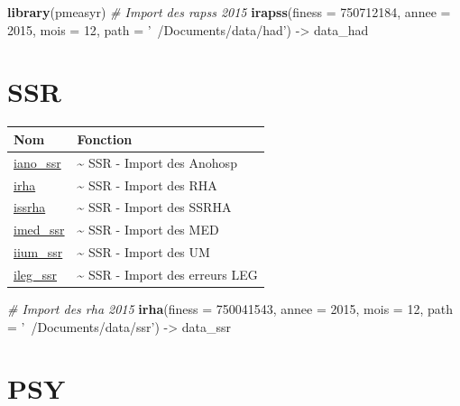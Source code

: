 \documentclass[]{book}
\newenvironment{Shaded}{\begin{snugshade}}{\end{snugshade}}
\newcommand{\KeywordTok}[1]{\textcolor[rgb]{0.13,0.29,0.53}{\textbf{{#1}}}}
\newcommand{\DataTypeTok}[1]{\textcolor[rgb]{0.13,0.29,0.53}{{#1}}}
\newcommand{\DecValTok}[1]{\textcolor[rgb]{0.00,0.00,0.81}{{#1}}}
\newcommand{\StringTok}[1]{\textcolor[rgb]{0.31,0.60,0.02}{{#1}}}
\newcommand{\CommentTok}[1]{\textcolor[rgb]{0.56,0.35,0.01}{\textit{{#1}}}}
\newcommand{\NormalTok}[1]{{#1}}
\begin{document}
\begin{Shaded}
\begin{Highlighting}[]
\KeywordTok{library}\NormalTok{(pmeasyr)}
\CommentTok{# Import des rapss 2015}
\KeywordTok{irapss}\NormalTok{(}\DataTypeTok{finess =} \DecValTok{750712184}\NormalTok{,}
       \DataTypeTok{annee =} \DecValTok{2015}\NormalTok{,}
       \DataTypeTok{mois =} \DecValTok{12}\NormalTok{,}
       \DataTypeTok{path =} \StringTok{'~/Documents/data/had'}\NormalTok{) ->}\StringTok{ }\NormalTok{data_had}
\end{Highlighting}
\end{Shaded}

\section{SSR}\label{ssr}

\begin{longtable}[]{@{}ll@{}}
\toprule
Nom & Fonction\tabularnewline
\midrule
\endhead
\href{https://github.com/IM-APHP/pmeasyr/tree/master/Rd_md/iano_ssr.Rmd}{iano\_ssr}
& \textasciitilde{} SSR - Import des Anohosp\tabularnewline
\href{https://github.com/IM-APHP/pmeasyr/tree/master/Rd_md/irha.Rmd}{irha}
& \textasciitilde{} SSR - Import des RHA\tabularnewline
\href{https://github.com/IM-APHP/pmeasyr/tree/master/Rd_md/issrha.Rmd}{issrha}
& \textasciitilde{} SSR - Import des SSRHA\tabularnewline
\href{https://github.com/IM-APHP/pmeasyr/tree/master/Rd_md/imed_ssr.Rmd}{imed\_ssr}
& \textasciitilde{} SSR - Import des MED\tabularnewline
\href{https://github.com/IM-APHP/pmeasyr/tree/master/Rd_md/iium_ssr.Rmd}{iium\_ssr}
& \textasciitilde{} SSR - Import des UM\tabularnewline
\href{https://github.com/IM-APHP/pmeasyr/tree/master/Rd_md/ileg_ssr.Rmd}{ileg\_ssr}
& \textasciitilde{} SSR - Import des erreurs LEG\tabularnewline
\bottomrule
\end{longtable}

\begin{Shaded}
\begin{Highlighting}[]
\CommentTok{# Import des rha 2015}
\KeywordTok{irha}\NormalTok{(}\DataTypeTok{finess =} \DecValTok{750041543}\NormalTok{,}
     \DataTypeTok{annee =} \DecValTok{2015}\NormalTok{,}
     \DataTypeTok{mois =} \DecValTok{12}\NormalTok{,}
     \DataTypeTok{path =} \StringTok{'~/Documents/data/ssr'}\NormalTok{) ->}\StringTok{ }\NormalTok{data_ssr}
\end{Highlighting}
\end{Shaded}

\section{PSY}\label{psy}
\end{document}
